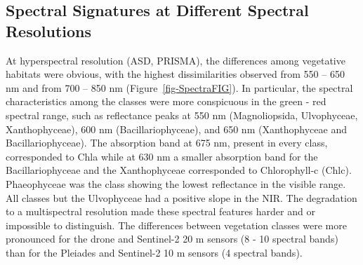\documentclass[
  letterpaper,
  11pt,
  english,
  singlespacing,
  headsepline]{MastersDoctoralThesis}
\begin{document}
\begin{spacing}{1.5}
\subsection{Spectral Signatures at Different Spectral
Resolutions}\label{spectral-signatures-at-different-spectral-resolutions}

At hyperspectral resolution (ASD, PRISMA), the differences among
vegetative habitats were obvious, with the highest dissimilarities
observed from 550 -- 650 nm and from 700 -- 850 nm
(Figure~\ref{fig-SpectraFIG}). In particular, the spectral
characteristics among the classes were more conspicuous in the green -
red spectral range, such as reflectance peaks at 550 nm (Magnoliopsida,
Ulvophyceae, Xanthophyceae), 600 nm (Bacillariophyceae), and 650 nm
(Xanthophyceae and Bacillariophyceae). The absorption band at 675 nm,
present in every class, corresponded to Chla while at 630 nm a smaller
absorption band for the Bacillariophyceae and the Xanthophyceae
corresponded to Chlorophyll-c (Chlc). Phaeophyceae was the class showing
the lowest reflectance in the visible range. All classes but the
Ulvophyceae had a positive slope in the NIR. The degradation to a
multispectral resolution made these spectral features harder and or
impossible to distinguish. The differences between vegetation classes
were more pronounced for the drone and Sentinel-2 20 m sensors (8 - 10
spectral bands) than for the Pleiades and Sentinel-2 10 m sensors (4
spectral bands).

\begin{figure}

\end{figure}
\end{spacing}
\end{document}
